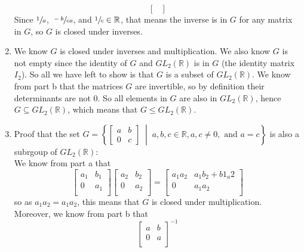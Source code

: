 \documentclass{article}
\newcommand{\R}{\mathbb{R}}
\begin{document}
\begin{enumerate}[label=\textbf{\alph*.}]
\[\begin{bmatrix}
            \end{bmatrix} \]
            Since $\sfrac{1}{a}$, $\sfrac{-b}{ca}$,
            and $\sfrac{1}{c} \in \R$,
            that means the inverse is in $G$ for any matrix in $G$,
            so $G$ is closed under inverses.
        \item
            We know $G$ is closed under inverses and multiplication.
            We also know $G$ is not empty since the identity of $G$
            and $GL_2(\R)$ is in $G$ (the identity matrix $I_2$).
            So all we have left to show is that $G$ is a subset of $GL_2(\R)$.
            We know from part b that the matrices $G$ are invertible,
            so by definition their determinants are not 0.
            So all elements in $G$ are also in $GL_2(\R)$,
            hence $G \subseteq GL_2(\R)$,
            which means that $G \leqslant GL_2(\R)$.
        \item
            Proof that the set
            $G = \left\{ \begin{bmatrix} a & b \\ 0 & c \end{bmatrix} \;
            \middle\vert \; a, b, c \in \R, a, c \neq 0,
            \text{ and } a = c \right\}$
            is also a subrgoup of $GL_2(\R)$: \\
            We know from part a that
            \[ \begin{bmatrix}
            a_1 & b_1 \\
            0 & a_1 \\
            \end{bmatrix}
            \begin{bmatrix}
            a_2 & b_2 \\
            0 & a_2 \\
            \end{bmatrix}
            = \begin{bmatrix}
            a_1a_2 & a_1b_2 + b1_a2 \\
            0 & a_1a_2 \\
            \end{bmatrix} \]
            so as $a_1a_2 = a_1a_2$,
            this means that $G$ is closed under multiplication. \\
            Moreover, we know from part b that
            \[ \begin{bmatrix}
            a & b \\
            0 & a \\
            \end{bmatrix}^{-1}
\]
\end{enumerate}
\end{document}
